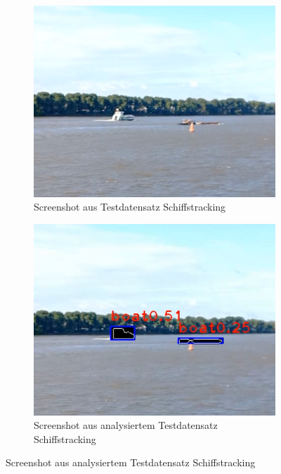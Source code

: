 {		
	\begin{figure}[ht]
		\begin{subfigure}[b]{0.45\textwidth}
			\centering
			\includegraphics[width=\linewidth]{images/Evaluation/shiptrack_cut_not_analyzed.png}
			\caption{Screenshot aus Testdatensatz Schiffstracking}
		\end{subfigure} \hfill
		\begin{subfigure}[b]{0.45\textwidth}
			\centering
			\includegraphics[width=\linewidth]{images/Evaluation/shiptrack_cut_analyzed.png}
			\caption{Screenshot aus analysiertem Testdatensatz Schiffstracking}
		\end{subfigure}

\end{figure}}
